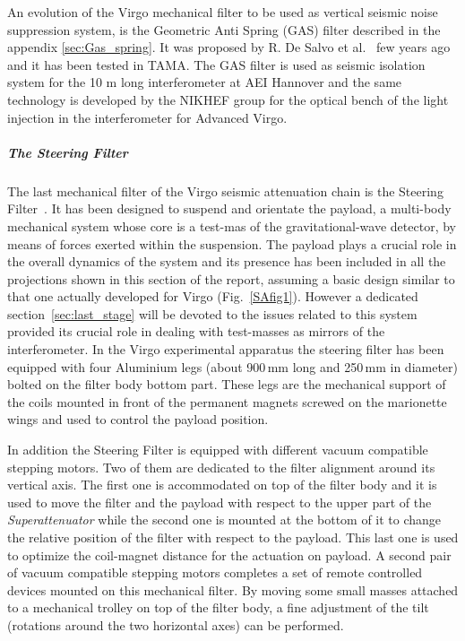 An evolution of the Virgo mechanical filter to be used as vertical seismic noise  
suppression system, is the Geometric Anti Spring (GAS) filter described in the appendix \ref{sec:Gas_spring}. It was proposed  by R. De Salvo et al.~\cite{cella} few years ago and it has been tested in TAMA. 
The GAS filter is used as seismic isolation system for the 10 m 
long interferometer at AEI Hannover and the same technology is developed by the NIKHEF group for the optical bench of the light injection in the interferometer for Advanced Virgo.


\subparagraph{The Steering Filter} \label{steeringF}

The last mechanical filter of the Virgo seismic attenuation chain is the Steering Filter~\cite{Ballardin2001}. It has been designed to suspend and orientate the payload, a multi-body mechanical system whose core is a test-mas of the gravitational-wave detector, by means of forces exerted within the suspension. The payload plays a crucial role in the overall dynamics 
of the system and its presence has been included in all the projections shown in this section of the report, assuming a basic design similar to that one actually developed for Virgo (Fig.~\ref{SAfig1}). However a dedicated section~\ref{sec:last_stage} will be devoted to the issues related to this 
system provided its crucial role in dealing with test-masses as mirrors of the interferometer. In the Virgo experimental apparatus the steering filter has been equipped with four Aluminium legs (about 900\,mm long and 250\,mm in diameter) bolted on the filter body bottom part. These legs are the mechanical support of the coils mounted in front of the permanent magnets screwed on the marionette wings and used to control the payload position.

In addition the Steering Filter is equipped with different vacuum compatible stepping motors. Two of them are dedicated to the filter alignment around its vertical axis. The first one is accommodated on top of the filter body and it is used to move the filter and the payload with respect to the upper part of the \emph{Superattenuator} while the second one is mounted at the bottom of it to change the relative position of the filter with respect to the payload. This last one is used to optimize the coil-magnet distance for the actuation on payload. A second pair of vacuum compatible stepping motors completes 
a set of remote controlled devices mounted on this mechanical filter. By moving some small masses attached to a mechanical trolley on top of the filter body, a fine adjustment of the tilt (rotations around the two horizontal axes) can be performed. 


